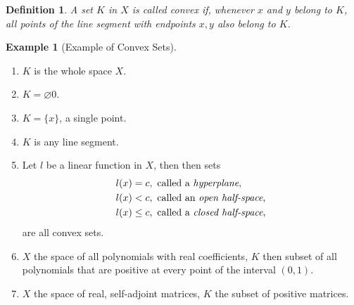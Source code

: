 \documentclass[11pt]{book}
\newtheorem{definition}{Definition}[chapter]
\theoremstyle{definition}
\newtheorem{example}{Example}[chapter]
\numberwithin{equation}{chapter}
\begin{document}
\medskip

\begin{definition}
A set $K$ in $X$ is called convex if, whenever $x$ and $y$ belong to $K$, all points of the line segment with endpoints $x, y$ also belong to $K$.
\end{definition}

\medskip

\begin{example}[Example of Convex Sets]
~\begin{enumerate}[label=(\arabic*)]
    \item $K$ is the whole space $X$.
    
    \item $K = \varnothing0$.
    
    \item $K = \{x\}$, a single point.
    
    \item $K$ is any line segment.
    
    \item Let $l$ be a linear function in $X$, then then sets 
    \begin{align*}
        l(x) & = c, \,\,\text{called a {\em hyperplane}}, \\
        l(x) & < c, \,\,\text{called an {\em open half-space}}, \\
        l(x) & \leq c, \,\,\text{called a {\em closed half-space}},
    \end{align*}
    are all convex sets.
    
    \item $X$ the space of all polynomials with real coefficients, $K$ then subset of all polynomials that are positive at every point of the interval $(0,1)$.
    
    \item $X$ the space of real, self-adjoint matrices, $K$ the subset of positive matrices.
\end{enumerate}
\end{example}

\medskip
\end{document}
